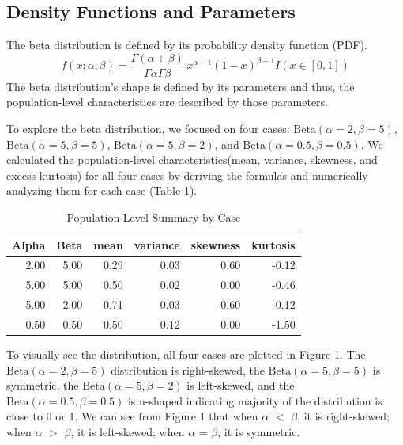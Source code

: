 \documentclass{article}\usepackage[]{graphicx}\usepackage[]{xcolor}
\begin{document}
\begin{multicols}{2}
\section{Density Functions and Parameters}
The beta distribution is defined by its probability density function (PDF).
\[
f(x; \alpha, \beta) = \frac{\Gamma(\alpha + \beta)}{\Gamma\alpha\Gamma\beta} \, x^{\alpha - 1} (1 - x)^{\beta - 1}I(x \in [0,1])
\] 
The beta distribution's shape is defined by its parameters and thus, the population-level characteristics are described by those parameters. 

To explore the beta distribution, we focused on four cases: \(\text{Beta}(\alpha = 2, \beta = 5)\), \(\text{Beta}(\alpha = 5, \beta = 5)\), \(\text{Beta}(\alpha = 5, \beta = 2)\), and \(\text{Beta}(\alpha = 0.5, \beta = 0.5)\). We calculated the population-level characteristics(mean, variance, skewness, and excess kurtosis) for all four cases by deriving the formulas and numerically analyzing them for each case (Table \ref{Table 1}). 



\begin{table}[H]
\centering
\begingroup\small
\begin{tabular}{rrrrrr}
  \hline
Alpha & Beta & mean & variance & skewness & kurtosis \\ 
  \hline
2.00 & 5.00 & 0.29 & 0.03 & 0.60 & -0.12 \\ 
  5.00 & 5.00 & 0.50 & 0.02 & 0.00 & -0.46 \\ 
  5.00 & 2.00 & 0.71 & 0.03 & -0.60 & -0.12 \\ 
  0.50 & 0.50 & 0.50 & 0.12 & 0.00 & -1.50 \\ 
   \hline
\end{tabular}
\endgroup
\caption{Population-Level Summary by Case} 
\label{Table 1}
\end{table}

To visually see the distribution, all four cases are plotted in Figure 1. The \(\text{Beta}(\alpha = 2, \beta = 5)\) distribution is right-skewed, the \(\text{Beta}(\alpha = 5, \beta = 5)\) is symmetric, the \(\text{Beta}(\alpha = 5, \beta = 2)\) is left-skewed, and the \(\text{Beta}(\alpha = 0.5, \beta = 0.5)\) is u-shaped indicating majority of the distribution is close to 0 or 1. We can see from Figure 1 that when \(\alpha\) \(<\) \(\beta\), it is right-skewed; when \(\alpha\) \(>\) \(\beta\), it is left-skewed; when \(\alpha\)  = \(\beta\), it is symmetric. 


\end{multicols}
\end{document}
